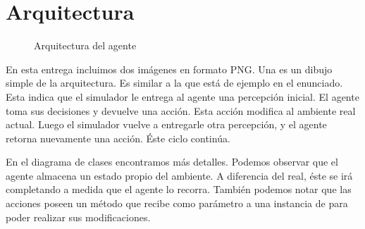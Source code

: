 \section{Arquitectura}

\begin{figure}[h]
\label{fig:arquitectura}
\caption{Arquitectura del agente}
\end{figure}

En esta entrega incluimos dos imágenes en formato PNG. Una es un dibujo simple
de la arquitectura. Es similar a la que está de ejemplo en el enunciado. Esta
indica que el simulador le entrega al agente una percepción inicial. El agente
toma sus decisiones y devuelve una acción. Esta acción modifica al ambiente
real actual. Luego el simulador vuelve a entregarle otra percepción, y el
agente retorna nuevamente una acción. Éste ciclo continúa.

En el diagrama de clases encontramos más detalles. Podemos observar que el
agente almacena un estado propio del ambiente. A diferencia del real, éste se
irá completando a medida que el agente lo recorra. También podemos notar que
las acciones poseen un método  que recibe como parámetro a una
instancia de  para poder realizar sus modificaciones.
